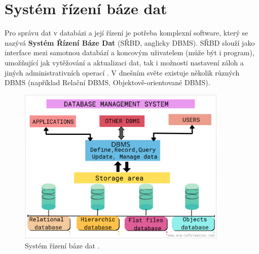 \section{Systém řízení báze dat}
Pro správu dat v databázi a její řízení je potřeba komplexní software, který se nazývá \textbf{Systém Řízení Báze Dat} (SŘBD, anglicky \gls{DBMS}). SŘBD slouží jako interface mezi samotnou databází a koncovým uživatelem (může být i program), umožňující jak vytěžování a aktualizaci dat, tak i možnosti nastavení záloh a jiných administrativních operací \cite{OracleDB}. V dnešním světe existuje několik různých \gls{DBMS} (například Relační \gls{DBMS}, Objektově-orientované \gls{DBMS}).
\begin{figure}[h!]
\centering
\includegraphics[width=10cm]{img/databaze/dbms}
\caption{Systém řízení báze dat \cite{img_dbms}.}
\label{fig:dbms}
\end{figure}


